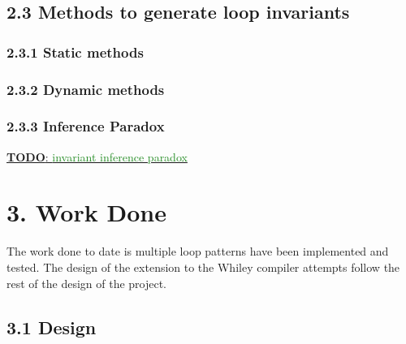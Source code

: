 \documentclass[11pt, a4paper, twoside, openright]{report}
\newcommand{\todo}[1]{\huge{\underline{\textbf{\textcolor{RubineRed}{TODO}}: \textcolor{ForestGreen}{#1}}}\normalsize }
\begin{document}
\subsection*{2.3 Methods to generate loop invariants}

\subsubsection*{2.3.1 Static methods}

\cite{benderfinding} 
\cite{Leino2005LoopIO}

\subsubsection*{2.3.2 Dynamic methods}

\cite{infer-dynamic}
\cite{infer-postconditions}

\subsubsection*{2.3.3 Inference Paradox}

\todo{invariant inference paradox}
\cite{infer-postconditions}


\section*{3. Work Done}

The work done to date is multiple loop patterns have been implemented and
tested. The design of the extension to the Whiley compiler attempts follow
the rest of the design of the project.

\subsection*{3.1 Design}
\end{document}
